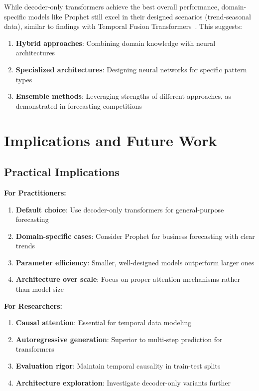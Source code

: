 \documentclass[11pt]{article}
\begin{document}
While decoder-only transformers achieve the best overall performance, domain-specific models like Prophet still excel in their designed scenarios (trend-seasonal data), similar to findings with Temporal Fusion Transformers~\cite{lim2021temporal}. This suggests:

\begin{enumerate}
\item \textbf{Hybrid approaches}: Combining domain knowledge with neural architectures
\item \textbf{Specialized architectures}: Designing neural networks for specific pattern types
\item \textbf{Ensemble methods}: Leveraging strengths of different approaches, as demonstrated in forecasting competitions~\cite{makridakis2020m4}
\end{enumerate}

\section{Implications and Future Work}

\subsection{Practical Implications}

\textbf{For Practitioners:}
\begin{enumerate}
\item \textbf{Default choice}: Use decoder-only transformers for general-purpose forecasting
\item \textbf{Domain-specific cases}: Consider Prophet for business forecasting with clear trends
\item \textbf{Parameter efficiency}: Smaller, well-designed models outperform larger ones
\item \textbf{Architecture over scale}: Focus on proper attention mechanisms rather than model size
\end{enumerate}

\textbf{For Researchers:}
\begin{enumerate}
\item \textbf{Causal attention}: Essential for temporal data modeling
\item \textbf{Autoregressive generation}: Superior to multi-step prediction for transformers
\item \textbf{Evaluation rigor}: Maintain temporal causality in train-test splits
\item \textbf{Architecture exploration}: Investigate decoder-only variants further
\end{enumerate}
\end{document}
